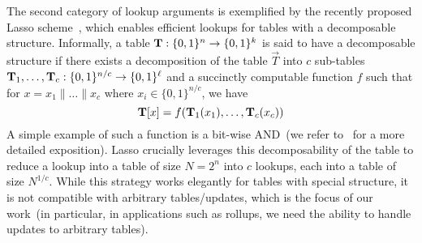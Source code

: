 
\medskip

 The second category of lookup arguments is exemplified by the recently proposed Lasso scheme~\cite{lasso,jolt},
which enables efficient lookups for tables with a decomposable structure.
Informally, a table $\mathbf{T}:\{0,1\}^n\to \{0,1\}^k$ is said to have a decomposable structure if there exists
a decomposition of the table $\vec{T}$ into $c$ sub-tables $\mathbf{T}_1,\ldots,\mathbf{T}_c:\{0,1\}^{n/c} \to\{0,1\}^\ell$ and a
succinctly computable function $f$ such that for $x = x_1\|\ldots\|x_c$ where $x_i \in \{0,1\}^{n/c}$, we have
\vspace{-1mm}
\[\mathbf{T}[x] = f(\mathbf{T}_1(x_1),\ldots,\mathbf{T}_c(x_c))\]
A simple example of such a function is a bit-wise AND~(we refer to~\cite{lasso,jolt} for a more detailed exposition).
Lasso crucially leverages this decomposability of the table to reduce a lookup into a table of size $N=2^n$ into $c$ lookups,
each into a table of size $N^{1/c}$.
While this strategy works elegantly for tables with special structure, it is not compatible with arbitrary tables/updates,
which is the focus of our work~(in particular, in applications such as rollups, we need the ability to handle updates to arbitrary tables).

